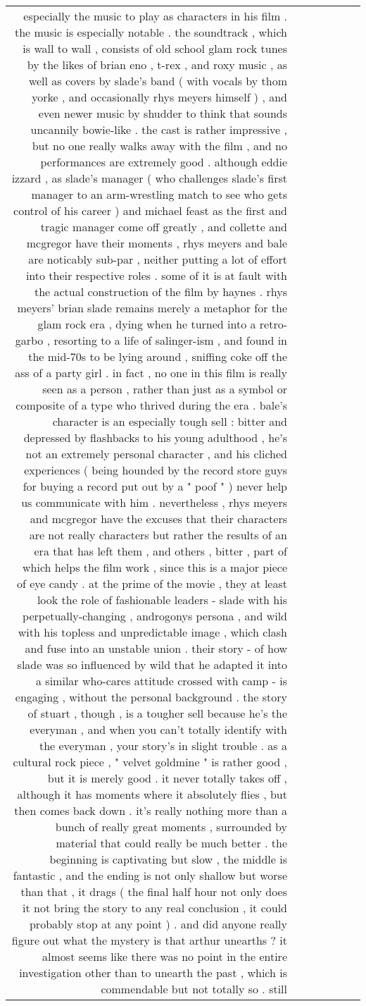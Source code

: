 \begin{tabular}{rlrrrlr}
especially the music to play as characters in his film .  the music is especially notable .  the soundtrack , which is wall to wall , consists of old school glam rock tunes by the likes of brian eno , t-rex , and roxy music , as well as covers by slade's band ( with vocals by thom yorke , and occasionally rhys meyers himself ) , and even newer music by shudder to think that sounds uncannily bowie-like .  the cast is rather impressive , but no one really walks away with the film , and no performances are extremely good .  although eddie izzard , as slade's manager ( who challenges slade's first manager to an arm-wrestling match to see who gets control of his career ) and michael feast as the first and tragic manager come off greatly , and collette and mcgregor have their moments , rhys meyers and bale are noticably sub-par , neither putting a lot of effort into their respective roles .  some of it is at fault with the actual construction of the film by haynes .  rhys meyers' brian slade remains merely a metaphor for the glam rock era , dying when he turned into a retro-garbo , resorting to a life of salinger-ism , and found in the mid-70s to be lying around , sniffing coke off the ass of a party girl .  in fact , no one in this film is really seen as a person , rather than just as a symbol or composite of a type who thrived during the era .  bale's character is an especially tough sell : bitter and depressed by flashbacks to his young adulthood , he's not an extremely personal character , and his cliched experiences ( being hounded by the record store guys for buying a record put out by a " poof " ) never help us communicate with him .  nevertheless , rhys meyers and mcgregor have the excuses that their characters are not really characters but rather the results of an era that has left them , and others , bitter , part of which helps the film work , since this is a major piece of eye candy .  at the prime of the movie , they at least look the role of fashionable leaders - slade with his perpetually-changing , androgonys persona , and wild with his topless and unpredictable image , which clash and fuse into an unstable union .  their story - of how slade was so influenced by wild that he adapted it into a similar who-cares attitude crossed with camp - is engaging , without the personal background .  the story of stuart , though , is a tougher sell because he's the everyman , and when you can't totally identify with the everyman , your story's in slight trouble .  as a cultural rock piece , " velvet goldmine " is rather good , but it is merely good .  it never totally takes off , although it has moments where it absolutely flies , but then comes back down .  it's really nothing more than a bunch of really great moments , surrounded by material that could really be much better .  the beginning is captivating but slow , the middle is fantastic , and the ending is not only shallow but worse than that , it drags ( the final half hour not only does it not bring the story to any real conclusion , it could probably stop at any point ) .  and did anyone really figure out what the mystery is that arthur unearths ?  it almost seems like there was no point in the entire investigation other than to unearth the past , which is commendable but not totally so .  still 
\end{tabular}
